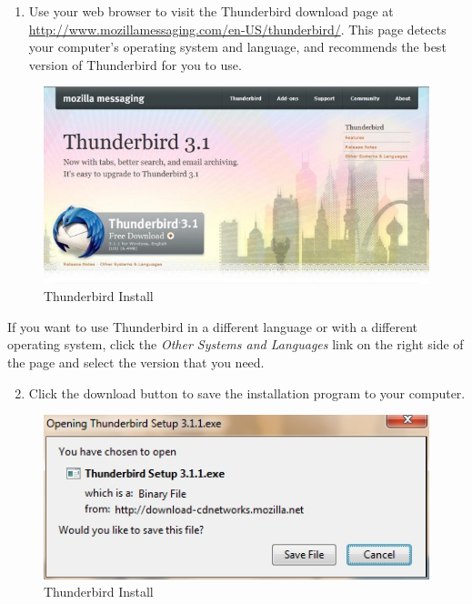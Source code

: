 \begin{enumerate}[1.]
\item
  Use your web browser to visit the Thunderbird download page at
  \href{http://www.mozillamessaging.com/en-US/thunderbird/}{http://www.mozillamessaging.com/en-US/thunderbird/}.
  This page detects your computer's operating system and language, and
  recommends the best version of Thunderbird for you to use.
\end{enumerate}
\begin{figure}[htbp]
\centering
\includegraphics{thunderbird_inst_1.jpg}
\caption{Thunderbird Install}
\end{figure}

If you want to use Thunderbird in a different language or with a
different operating system, click the \emph{Other Systems and Languages}
link on the right side of the page and select the version that you need.

\begin{enumerate}[1.]
\setcounter{enumi}{1}
\item
  Click the download button to save the installation program to your
  computer.
\end{enumerate}
\begin{figure}[htbp]
\centering
\includegraphics{thunderbird_inst_2.jpg}
\caption{Thunderbird Install}
\end{figure}

